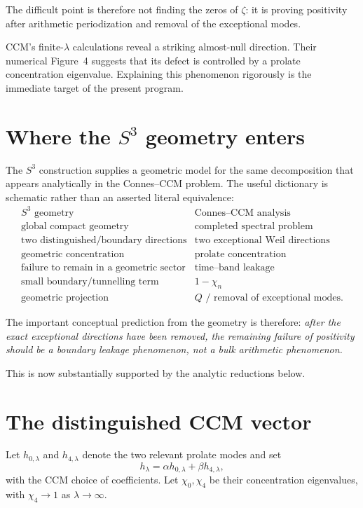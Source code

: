 \documentclass[11pt]{article}
\begin{document}
The difficult point is therefore not finding the zeros of \(\zeta\):
it is proving positivity after arithmetic periodization and removal of
the exceptional modes.

CCM's finite-\(\lambda\) calculations reveal a striking almost-null
direction.  Their numerical Figure~4 suggests that its defect is
controlled by a prolate concentration eigenvalue.  Explaining this
phenomenon rigorously is the immediate target of the present program.

\section{Where the \(S^3\) geometry enters}

The \(S^3\) construction supplies a geometric model for the same
decomposition that appears analytically in the Connes--CCM problem.
The useful dictionary is schematic rather than an asserted literal
equivalence:
\[
\begin{array}{c|c}
S^3\text{ geometry} & \text{Connes--CCM analysis}\\
\hline
\text{global compact geometry}
&
\text{completed spectral problem}
\\
\text{two distinguished/boundary directions}
&
\text{two exceptional Weil directions}
\\
\text{geometric concentration}
&
\text{prolate concentration}
\\
\text{failure to remain in a geometric sector}
&
\text{time--band leakage}
\\
\text{small boundary/tunnelling term}
&
1-\chi_n
\\
\text{geometric projection}
&
Q\text{ / removal of exceptional modes}.
\end{array}
\]

The important conceptual prediction from the geometry is therefore:
\emph{after the exact exceptional directions have been removed, the
remaining failure of positivity should be a boundary leakage phenomenon,
not a bulk arithmetic phenomenon.}

This is now substantially supported by the analytic reductions below.

\section{The distinguished CCM vector}

Let \(h_{0,\lambda}\) and \(h_{4,\lambda}\) denote the two relevant
prolate modes and set
\[
        h_\lambda
        =
        \alpha h_{0,\lambda}
        +
        \beta h_{4,\lambda},
\]
with the CCM choice of coefficients.  Let
\(\chi_0,\chi_4\) be their concentration eigenvalues, with
\(\chi_4\to1\) as \(\lambda\to\infty\).
\end{document}
